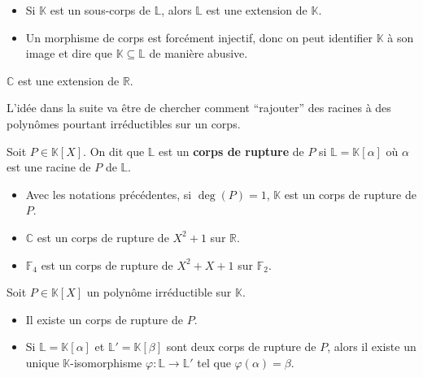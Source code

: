 	\begin{remark}
		\begin{itemize}
			\item Si $\mathbb{K}$ est un sous-corps de $\mathbb{L}$, alors $\mathbb{L}$ est une extension de $\mathbb{K}$.
			\item Un morphisme de corps est forcément injectif, donc on peut identifier $\mathbb{K}$ à son image et dire que $\mathbb{K} \subseteq \mathbb{L}$ de manière abusive.
		\end{itemize}
	\end{remark}
	
	\begin{example}
		$\mathbb{C}$ est une extension de $\mathbb{R}$.
	\end{example}
	
	L'idée dans la suite va être de chercher comment ``rajouter'' des racines à des polynômes pourtant irréductibles sur un corps.
	
	
	\begin{definition}
		Soit $P \in \mathbb{K}[X]$. On dit que $\mathbb{L}$ est un \textbf{corps de rupture} de $P$ si $\mathbb{L} = \mathbb{K}[\alpha]$ où $\alpha$ est une racine de $P$ de $\mathbb{L}$.
	\end{definition}
	
	\begin{example}
		\begin{itemize}
			\item Avec les notations précédentes, si $\deg(P) = 1$, $\mathbb{K}$ est un corps de rupture de $P$.
			\item $\mathbb{C}$ est un corps de rupture de $X^2+1$ sur $\mathbb{R}$.
			\item $\mathbb{F}_4$ est un corps de rupture de $X^2+X+1$ sur $\mathbb{F}_2$.
		\end{itemize}
	\end{example}
	
	\begin{theorem}
		Soit $P \in \mathbb{K}[X]$ un polynôme irréductible sur $\mathbb{K}$.
		\begin{itemize}
			\item Il existe un corps de rupture de $P$.
			\item Si $\mathbb{L} = \mathbb{K}[\alpha]$ et $\mathbb{L}' = \mathbb{K}[\beta]$ sont deux corps de rupture de $P$, alors il existe un unique $\mathbb{K}$-isomorphisme $\varphi : \mathbb{L} \rightarrow \mathbb{L}'$ tel que $\varphi(\alpha) = \beta$.
		\end{itemize}
	\end{theorem}
	
